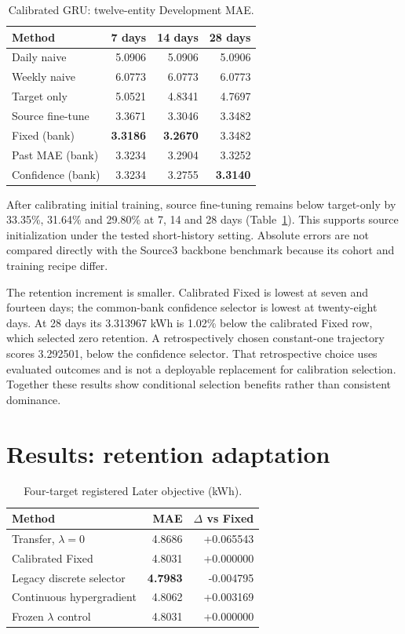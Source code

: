 \documentclass[pdflatex,iicol,sn-mathphys-num]{sn-jnl}
\begin{document}
\begin{table}[t]
\centering\small
\caption{Calibrated GRU: twelve-entity Development MAE.}\label{tab:dev}
\begin{tabularx}{\columnwidth}{@{}Xrrr@{}}\toprule
Method & 7 days & 14 days & 28 days\\\midrule
Daily naive & 5.0906 & 5.0906 & 5.0906\\
Weekly naive & 6.0773 & 6.0773 & 6.0773\\
Target only & 5.0521 & 4.8341 & 4.7697\\
Source fine-tune & 3.3671 & 3.3046 & 3.3482\\
Fixed (bank) & \textbf{3.3186} & \textbf{3.2670} & 3.3482\\
Past MAE (bank) & 3.3234 & 3.2904 & 3.3252\\
Confidence (bank) & 3.3234 & 3.2755 & \textbf{3.3140}\\
\bottomrule\end{tabularx}
\end{table}

After calibrating initial training, source fine-tuning remains below target-only by 33.35\%, 31.64\% and 29.80\% at 7, 14 and 28 days (Table~\ref{tab:dev}). This supports source initialization under the tested short-history setting. Absolute errors are not compared directly with the Source3 backbone benchmark because its cohort and training recipe differ.

The retention increment is smaller. Calibrated Fixed is lowest at seven and fourteen days; the common-bank confidence selector is lowest at twenty-eight days. At 28 days its 3.313967 kWh is 1.02\% below the calibrated Fixed row, which selected zero retention. A retrospectively chosen constant-one trajectory scores 3.292501, below the confidence selector. That retrospective choice uses evaluated outcomes and is not a deployable replacement for calibration selection. Together these results show conditional selection benefits rather than consistent dominance.

\section{Results: retention adaptation}
\begin{table}[t]
\centering\small
\caption{Four-target registered Later objective (kWh).}\label{tab:later}
\begin{tabularx}{\columnwidth}{@{}Xrr@{}}\toprule
Method & MAE & $\Delta$ vs Fixed\\\midrule
Transfer, $\lambda=0$ & 4.8686 & +0.065543\\
Calibrated Fixed & 4.8031 & +0.000000\\
Legacy discrete selector & \textbf{4.7983} & -0.004795\\
Continuous hypergradient & 4.8062 & +0.003169\\
Frozen $\lambda$ control & 4.8031 & +0.000000\\
\bottomrule\end{tabularx}
\end{table}
\end{document}
